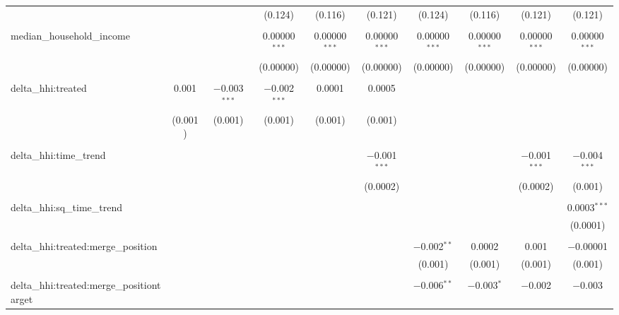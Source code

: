\begin{table}[H]
{\begin{tabular}{@{\extracolsep{5pt}}lccccccccc}
   &  &  & (0.124) & (0.116) & (0.121) & (0.124) & (0.116) & (0.121) & (0.121) \\  

   & & & & & & & & & \\  

  median\_household\_income &  &  & 0.00000$^{***}$ & 0.00000$^{***}$ & 0.00000$^{***}$ & 0.00000$^{***}$ & 0.00000$^{***}$ & 0.00000$^{***}$ & 0.00000$^{***}$ \\  

   &  &  & (0.00000) & (0.00000) & (0.00000) & (0.00000) & (0.00000) & (0.00000) & (0.00000) \\  

   & & & & & & & & & \\  

  delta\_hhi:treated & 0.001 & $-$0.003$^{***}$ & $-$0.002$^{***}$ & 0.0001 & 0.0005 &  &  &  &  \\  

   & (0.001) & (0.001) & (0.001) & (0.001) & (0.001) &  &  &  &  \\  

   & & & & & & & & & \\  

  delta\_hhi:time\_trend &  &  &  &  & $-$0.001$^{***}$ &  &  & $-$0.001$^{***}$ & $-$0.004$^{***}$ \\  

   &  &  &  &  & (0.0002) &  &  & (0.0002) & (0.001) \\  

   & & & & & & & & & \\  

  delta\_hhi:sq\_time\_trend &  &  &  &  &  &  &  &  & 0.0003$^{***}$ \\  

   &  &  &  &  &  &  &  &  & (0.0001) \\  

   & & & & & & & & & \\  

  delta\_hhi:treated:merge\_position &  &  &  &  &  & $-$0.002$^{**}$ & 0.0002 & 0.001 & $-$0.00001 \\  

   &  &  &  &  &  & (0.001) & (0.001) & (0.001) & (0.001) \\  

   & & & & & & & & & \\  

  delta\_hhi:treated:merge\_positiontarget &  &  &  &  &  & $-$0.006$^{**}$ & $-$0.003$^{*}$ & $-$0.002 & $-$0.003 \\  


\end{tabular}}
\end{table}

